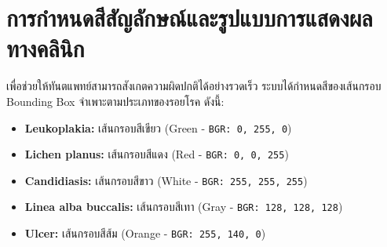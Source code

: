 \section{การกำหนดสีสัญลักษณ์และรูปแบบการแสดงผลทางคลินิก}
เพื่อช่วยให้ทันตแพทย์สามารถสังเกตความผิดปกติได้อย่างรวดเร็ว ระบบได้กำหนดสีของเส้นกรอบ Bounding Box จำเพาะตามประเภทของรอยโรค ดังนี้:
\begin{itemize}
    \item \textbf{Leukoplakia:} เส้นกรอบสีเขียว (Green - \texttt{BGR: 0, 255, 0})
    \item \textbf{Lichen planus:} เส้นกรอบสีแดง (Red - \texttt{BGR: 0, 0, 255})
    \item \textbf{Candidiasis:} เส้นกรอบสีขาว (White - \texttt{BGR: 255, 255, 255})
    \item \textbf{Linea alba buccalis:} เส้นกรอบสีเทา (Gray - \texttt{BGR: 128, 128, 128})
    \item \textbf{Ulcer:} เส้นกรอบสีส้ม (Orange - \texttt{BGR: 255, 140, 0})
\end{itemize}
